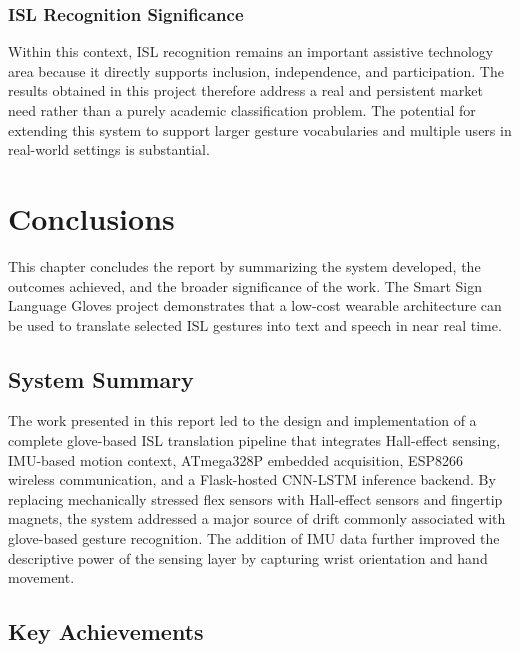 \documentclass[12pt,a4paper]{report}
\begin{document}
\subsection{ISL Recognition Significance}
Within this context, ISL recognition remains an important assistive technology area because it directly supports inclusion, independence, and participation. The results obtained in this project therefore address a real and persistent market need rather than a purely academic classification problem. The potential for extending this system to support larger gesture vocabularies and multiple users in real-world settings is substantial.


\chapter{Conclusions}

This chapter concludes the report by summarizing the system developed, the outcomes achieved, and the broader significance of the work. The Smart Sign Language Gloves project demonstrates that a low-cost wearable architecture can be used to translate selected ISL gestures into text and speech in near real time.

\section{System Summary}
\label{sec:concl_summary}

The work presented in this report led to the design and implementation of a complete glove-based ISL translation pipeline that integrates Hall-effect sensing, IMU-based motion context, ATmega328P embedded acquisition, ESP8266 wireless communication, and a Flask-hosted CNN-LSTM inference backend. By replacing mechanically stressed flex sensors with Hall-effect sensors and fingertip magnets, the system addressed a major source of drift commonly associated with glove-based gesture recognition. The addition of IMU data further improved the descriptive power of the sensing layer by capturing wrist orientation and hand movement.

\section{Key Achievements}
\label{sec:concl_achievements}
\end{document}
